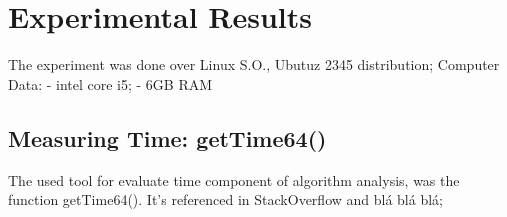 \section{Experimental Results}\label{sec:3}

The experiment was done over Linux S.O., Ubutuz 2345 distribution;
Computer Data:
  - intel core i5;
  - 6GB RAM

\subsection{Measuring Time: getTime64()}
        The used tool for evaluate time component of algorithm analysis, was the function getTime64(). It's referenced in StackOverflow and blá blá blá;